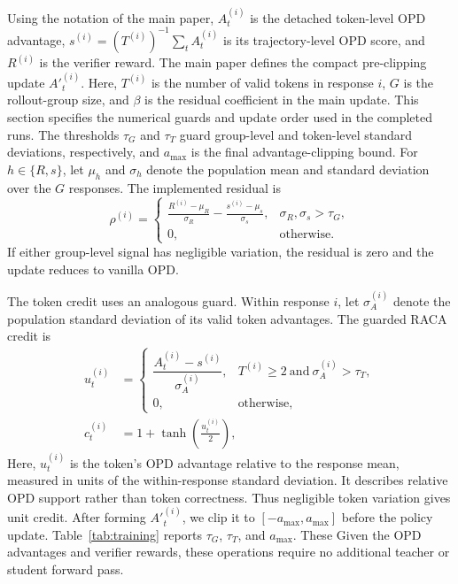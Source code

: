 Using the notation of the main paper, $A^{(i)}_t$ is the detached token-level OPD
advantage, $s^{(i)}=(T^{(i)})^{-1}\sum_t A^{(i)}_t$ is its trajectory-level OPD score, and
$R^{(i)}$ is the verifier reward. The main paper defines the compact
pre-clipping update $A'^{(i)}_t$. Here, $T^{(i)}$ is the number of valid tokens
in response $i$, $G$ is the rollout-group size, and $\beta$ is the residual
coefficient in the main update. This section specifies the numerical guards and
update order used in the completed runs. The thresholds $\tau_G$ and $\tau_T$
guard group-level and token-level standard deviations, respectively, and
$a_{\max}$ is the final advantage-clipping bound. For $h\in\{R,s\}$, let
$\mu_h$ and $\sigma_h$ denote the population mean and standard deviation over
the $G$ responses. The implemented residual is
\begin{equation}
\rho^{(i)}=
\begin{cases}
\frac{R^{(i)}-\mu_R}{\sigma_R}
-\frac{s^{(i)}-\mu_s}{\sigma_s},
&\sigma_R,\sigma_s>\tau_G,\\
0,&\text{otherwise}.
\end{cases}
\label{eq:guarded-residual}
\end{equation}
If either group-level signal has negligible variation, the residual is zero
and the update reduces to vanilla OPD.

The token credit uses an analogous guard. Within response $i$, let
$\sigma_A^{(i)}$ denote the population standard deviation of its valid token
advantages. The guarded RACA credit is
\begin{align}
u^{(i)}_t&=
\begin{cases}
\dfrac{A^{(i)}_t-s^{(i)}}{\sigma_A^{(i)}},
&T^{(i)}\geq2\ \text{and}\ \sigma_A^{(i)}>\tau_T,\\
0,&\text{otherwise},
\end{cases}
\label{eq:normalized-token-advantage}\\
c^{(i)}_t&=1+\tanh\!\left(\frac{u^{(i)}_t}{2}\right),
\label{eq:implemented-token-credit}
\end{align}
Here, $u^{(i)}_t$ is the token's OPD advantage relative to the response mean,
measured in units of the within-response standard deviation. It describes
relative OPD support rather than token correctness. Thus negligible token
variation gives unit credit. After forming
$A'^{(i)}_t$, we clip it to $[-a_{\max},a_{\max}]$ before the policy update.
Table~\ref{tab:training} reports $\tau_G$, $\tau_T$, and $a_{\max}$. These
Given the OPD advantages and verifier rewards, these operations require no
additional teacher or student forward pass.

